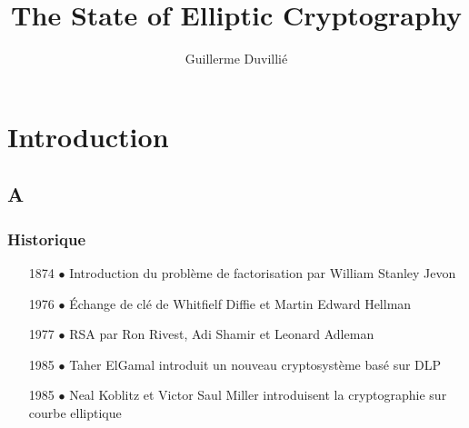 \documentclass[9pt]{beamer}
\title[Elliptic Curve Cryptography]{The State of Elliptic Cryptography}
\author[G. Duvillié]{Guillerme Duvillié}
\institute{Université Montpellier 2}
\begin{document}
\begin{frame}
    \titlepage
\end{frame}

\addtocounter{framenumber}{-1}

\section{Introduction}

\subsection*{A}

\begin{frame}
    \frametitle{Historique}
    \vfill
    \begin{itemize}
        \item[1874 $\bullet$] Introduction du problème de factorisation par William Stanley
            Jevon
            \vfill
            \pause
        \item[1976 $\bullet$] Échange de clé de Whitfielf Diffie et Martin Edward Hellman
            \vfill
            \pause
        \item[1977 $\bullet$] RSA par Ron Rivest, Adi Shamir et Leonard Adleman
            \vfill
            \pause
        \item[1985 $\bullet$] Taher ElGamal introduit un nouveau cryptosystème basé sur DLP
            \vfill
            \pause
        \item[1985 $\bullet$] Neal Koblitz et Victor Saul Miller introduisent la
            cryptographie sur courbe elliptique
            \vfill
    \end{itemize}
\end{frame}
\end{document}

